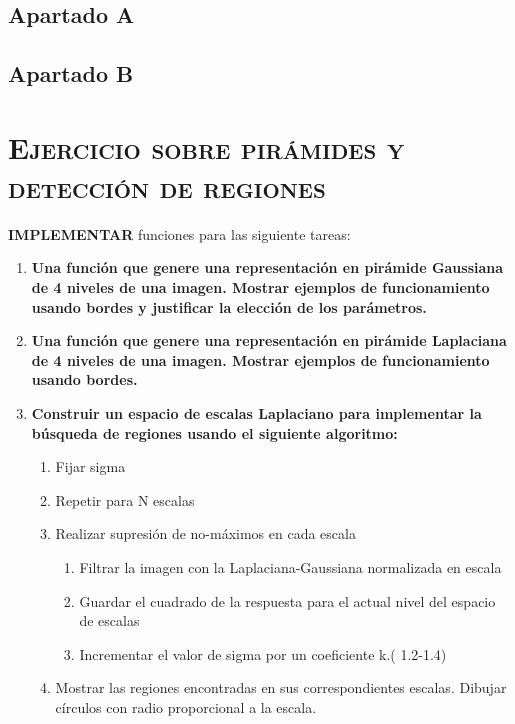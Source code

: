 \documentclass[11pt,a4paper]{article}
\begin{document}
\subsection{Apartado A}

\subsection{Apartado B}

\newpage

\section{\textsc{Ejercicio sobre pirámides y detección de regiones}}

\noindent \textbf{IMPLEMENTAR} funciones para las siguiente tareas:

\begin{enumerate}[label=\textbf{\Alph*)}]
	\item \textbf{Una función que genere una representación en pirámide Gaussiana de 4 niveles de una
	imagen. Mostrar ejemplos de funcionamiento usando bordes y justificar la elección de los parámetros.}
	\item \textbf{Una función que genere una representación en pirámide Laplaciana de 4 niveles de una imagen.
	Mostrar ejemplos de funcionamiento usando bordes.}
	\item \textbf{Construir un espacio de escalas Laplaciano para implementar la búsqueda de regiones usando el siguiente
	algoritmo:}
	\begin{enumerate}[label=\textbf{\alph*.}]
		\item Fijar sigma
		\item Repetir para N escalas
		\item Realizar supresión de no-máximos en cada escala
		\begin{enumerate}[label=\roman*.]
			\item Filtrar la imagen con la Laplaciana-Gaussiana normalizada en escala
			\item Guardar el cuadrado de la respuesta para el actual nivel del espacio de escalas
			\item Incrementar el valor de sigma por un coeficiente k.( 1.2-1.4)
		\end{enumerate}
		\item Mostrar las regiones encontradas en sus correspondientes escalas. Dibujar círculos con radio proporcional a
		la escala.
	\end{enumerate}
\end{enumerate}
\end{document}
